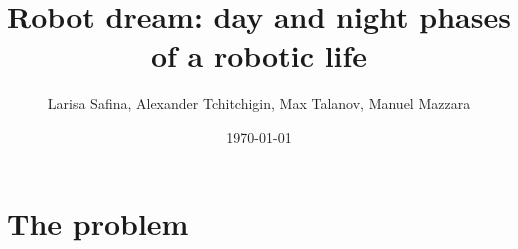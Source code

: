\documentclass[12pt, aspectratio=169]{beamer}
\title[Robot dream]{Robot dream: day and night phases of a robotic life} %
\author{Larisa Safina, Alexander Tchitchigin, Max Talanov, Manuel Mazzara}
\institute[IU] %
{
Software Science and Engineering Laboratory, IU \\ %
\medskip
\textit{l.safina@innopolis.ru} %
}
\date{\today} %
\begin{document}
\begin{frame}
\titlepage %
\end{frame}



\section{The problem} %
\end{document}
